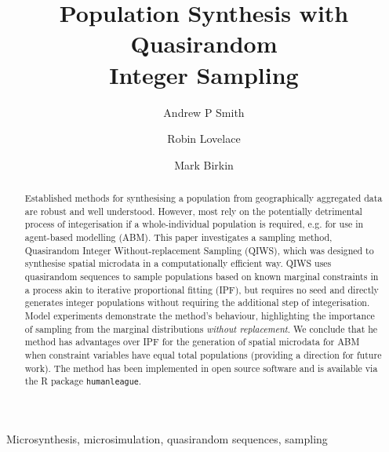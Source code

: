 \documentclass{JASSS}
\title{Population Synthesis with Quasirandom \\Integer Sampling}
\author[1]{Andrew P Smith}
\author[1]{Robin Lovelace}
\author[1]{Mark Birkin}
\affil[1]{University of Leeds}
\begin{document}
\maketitle 



\begin{abstract}
Established methods for synthesising a population from geographically
aggregated data are robust and well understood. However, most rely on
the potentially detrimental process of integerisation if a
whole-individual population is required, e.g. for use in agent-based
modelling (ABM). This paper investigates a sampling method,
Quasirandom Integer Without-replacement Sampling (QIWS),
which was designed to synthesise spatial microdata
in a computationally efficient way.
QIWS uses quasirandom sequences to sample populations
based on known marginal constraints in a process akin to
iterative proportional fitting (IPF), but requires no
seed and directly generates integer populations without requiring
the additional step of integerisation.
Model experiments demonstrate the method's
behaviour, highlighting the importance of sampling from
 the marginal distributions \emph{without replacement}.
We conclude that he method has advantages over IPF 
for the generation of spatial microdata for ABM when constraint
variables have equal total populations (providing a direction for future work).
The method has been implemented in open source software and is available via
the R package \texttt{humanleague}.
\end{abstract}

\begin{keywords}
Microsynthesis, microsimulation, quasirandom sequences, sampling
\end{keywords}

\parano{}



\end{document}
